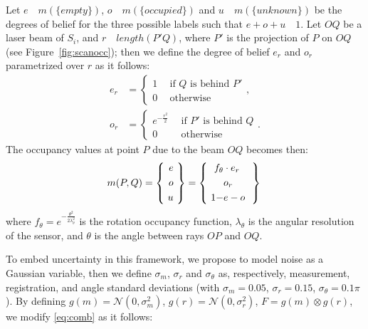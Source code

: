 Let  $e$~\shorteq~$m(\{empty\})$, $o$~\shorteq~$m(\{occupied\})$ and $u$~\shorteq~$m(\{unknown\})$ be the degrees of belief for the three possible labels such that $e + o + u$~\shorteq~$1$. 
Let $OQ$ be a laser beam of $S_i$, and $r$~\shorteq~$length(P'Q)$, where $P'$ is the projection of $P$ on $OQ$ (see Figure~\ref{fig:scanocc}); then we define the degree of belief $e_r$ and $o_r$ parametrized over $r$ as it follows:
\begin{align}
\label{eq:occ}
 e_r &=  \begin{cases}
               1 \ \ & \text{if $Q$ is behind $P'$}\\
               0 \ \ & \text{otherwise}
         \end{cases},\\
\label{eq:occ_2}
o_r &=  \begin{cases}
      e^{-\frac{r^2}{2}} \ \ & \text{if $P'$ is behind $Q$}\\
      0 \ \ & \text{otherwise}
        \end{cases}.
\end{align}
The occupancy values at point $P$ due to the beam $OQ$ becomes then:
\begin{equation}
\label{eq:comb}
 m(P,Q)=\left\{\  \begin{aligned}
                 e\\o\\u
                 \end{aligned}
\  \right\} = \left\{\  \begin{aligned}
                     f_\theta&\cdot e_r \ \\
                     &o_r \ \\
                     1 - &e - o \ 
                    \end{aligned}
\ \right\}\\
\end{equation}
where $f_\theta = e^{-\frac{\theta^2}{2\lambda_\theta^2}}$ is the rotation occupancy function, $\lambda_\theta$ is the angular resolution of the sensor, and $\theta$ is the angle between rays $OP$ and $OQ$.


To embed uncertainty in this framework, we propose to model noise as a Gaussian variable, then we define $\sigma_m$, $\sigma_r$ and $\sigma_\theta$ as, respectively, measurement, registration, and angle standard deviations (with $\sigma_m=0.05$, $\sigma_r=0.15$, $\sigma_{\theta}=0.1\pi$). 
By defining  $g(m) = \mathcal{N}(0, \sigma_m^2)$, $g(r) = \mathcal{N}(0, \sigma_r^2)$, $F = g(m)\otimes g(r)$, we modify \eqref{eq:comb} as it follows:

